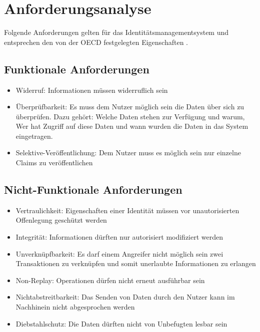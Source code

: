 \chapter{Anforderungsanalyse}
\label{cha:anforderungsanalyse}
Folgende Anforderungen gelten für das Identitätsmanagementsystem und entsprechen den von der OECD festgelegten Eigenschaften \cite{ID25} \cite{ID26}.
\section{Funktionale Anforderungen}

\begin{itemize}
	\item Widerruf: Informationen müssen widerruflich sein
	\item Überprüfbarkeit: Es muss dem Nutzer möglich sein die Daten über sich zu überprüfen. Dazu gehört: Welche Daten stehen zur Verfügung und warum, Wer hat Zugriff auf diese Daten und wann wurden die Daten in das System eingetragen.
	\item Selektive-Veröffentlichung: Dem Nutzer muss es möglich sein nur einzelne Claims zu veröffentlichen
\end{itemize}

\section{Nicht-Funktionale Anforderungen}

\begin{itemize}
	\item Vertraulichkeit: Eigenschaften einer Identität müssen vor unautorisierten Offenlegung geschützt werden
	\item Integrität: Informationen dürften nur autorisiert modifiziert werden
	\item Unverknüpfbarkeit: Es darf einem Angreifer nicht möglich sein zwei Transaktionen zu verknüpfen und somit unerlaubte Informationen zu erlangen
	\item Non-Replay: Operationen dürfen nicht erneut ausführbar sein
	\item Nichtabstreitbarkeit: Das Senden von Daten durch den Nutzer kann im Nachhinein nicht abgesprochen werden
	\item Diebstahlschutz: Die Daten dürften nicht von Unbefugten lesbar sein
	
\end{itemize}

